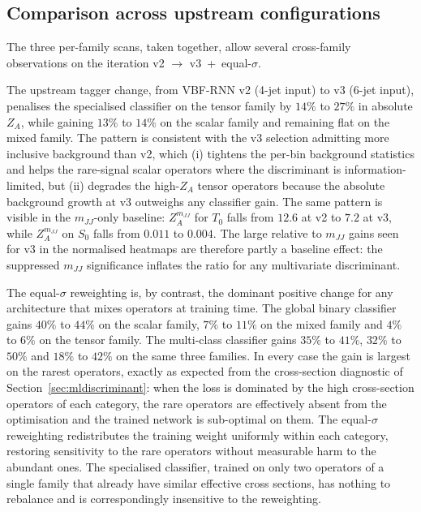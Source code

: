\subsection{Comparison across upstream configurations}
\label{sec:sens_iteration}

The three per-family scans, taken together, allow several cross-family observations on the iteration v2 $\to$ v3~+~equal-$\sigma$.

The upstream tagger change, from VBF-RNN v2 (4-jet input) to v3 (6-jet input), penalises the specialised classifier on the tensor family by $14\%$ to $27\%$ in absolute $Z_A$, while gaining $13\%$ to $14\%$ on the scalar family and remaining flat on the mixed family. The pattern is consistent with the v3 selection admitting more inclusive background than v2, which (i) tightens the per-bin background statistics and helps the rare-signal scalar operators where the discriminant is information-limited, but (ii) degrades the high-$Z_A$ tensor operators because the absolute background growth at v3 outweighs any classifier gain. The same pattern is visible in the $m_{JJ}$-only baseline: $Z_A^{m_{JJ}}$ for $T_0$ falls from $12.6$ at v2 to $7.2$ at v3, while $Z_A^{m_{JJ}}$ on $S_0$ falls from $0.011$ to $0.004$. The large relative to $m_{JJ}$ gains seen for v3 in the normalised heatmaps are therefore partly a baseline effect: the suppressed $m_{JJ}$ significance inflates the ratio for any multivariate discriminant.

The equal-$\sigma$ reweighting is, by contrast, the dominant positive change for any architecture that mixes operators at training time. The global binary classifier gains $40\%$ to $44\%$ on the scalar family, $7\%$ to $11\%$ on the mixed family and $4\%$ to $6\%$ on the tensor family. The multi-class classifier gains $35\%$ to $41\%$, $32\%$ to $50\%$ and $18\%$ to $42\%$ on the same three families. In every case the gain is largest on the rarest operators, exactly as expected from the cross-section diagnostic of Section~\ref{sec:mldiscriminant}: when the loss is dominated by the high cross-section operators of each category, the rare operators are effectively absent from the optimisation and the trained network is sub-optimal on them. The equal-$\sigma$ reweighting redistributes the training weight uniformly within each category, restoring sensitivity to the rare operators without measurable harm to the abundant ones. The specialised classifier, trained on only two operators of a single family that already have similar effective cross sections, has nothing to rebalance and is correspondingly insensitive to the reweighting.

